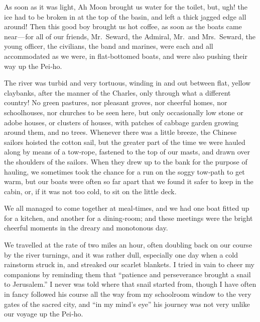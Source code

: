 \documentclass[12pt]{book}
\begin{document}
As soon as it was light, Ah Moon brought us water for the toilet, but, ugh!
the ice had to be broken in at the top of the basin, and left a thick jagged edge
all around! Then this good boy brought us hot coffee, as soon as the boats came
near — for all of our friends, Mr.~Seward, the Admiral, Mr.~and Mrs.~Seward, the
young officer, the civilians, the band and marines, were each and all accommodated
as we were, in flat‐bottomed boats, and were also pushing their way up the Pei‐ho.

The river was turbid and very tortuous, winding in and out between flat, yellow
claybanks, after the manner of the Charles, only through what a different country!
No green pastures, nor pleasant groves, nor cheerful homes, nor schoolhouses,
nor churches to be seen here, but only occasionally low stone or adobe houses, or
clusters of houses, with patches of cabbage garden growing around them, and no
trees. Whenever there was a little breeze, the Chinese sailors hoisted the cotton
sail, but the greater part of the time we were hauled along by means of a tow‐rope,
fastened to the top of our masts, and drawn over the shoulders of the sailors.
When they drew up to the bank for the purpose of hauling, we sometimes took
the chance for a run on the soggy tow‐path to get warm, but our boats were often
so far apart that we found it safer to keep in the cabin, or, if it was not too cold,
to sit on the little deck.

We all managed to come together at meal‐times, and we had one boat fitted
up for a kitchen, and another for a dining‐room; and these meetings were the
bright cheerful moments in the dreary and monotonous day.

We travelled at the rate of two miles an hour, often doubling back on our
course by the river turnings, and it was rather dull, especially one day when a
cold rainstorm struck in, and streaked our scarlet blankets. I tried in vain to cheer
my companions by reminding them that “patience and perseverance brought a
snail to Jerusalem.” I never was told where that snail started from, though I have
often in fancy followed his course all the way from my schoolroom window to
the very gates of the sacred city, and “in my mind’s eye” his journey was not very
unlike our voyage up the Pei‐ho.
\end{document}
